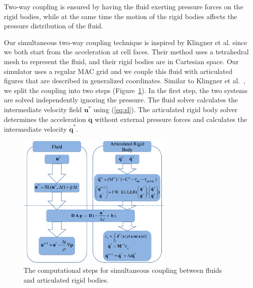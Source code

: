 Two-way coupling is ensured by having the fluid exerting pressure forces
on the rigid bodies, while at the same time the motion of the rigid bodies
affects the pressure distribution of the fluid.

Our simultaneous two-way coupling technique is inspired by Klingner et al.
\cite{klingner2006mesh} since we both start from the acceleration at
cell faces.  Their method uses a tetrahedral mesh to represent the fluid,
and their rigid bodies are in Cartesian space.  Our simulator uses a
regular MAC grid and we couple this fluid with articulated figures that
are described in generalized coordinates.  Similar to Klingner et
al.~\cite{klingner2006mesh}, we split the coupling into two steps
(Figure~\ref{fig:graph}). In the first step, the two systems are solved
independently ignoring the pressure. The fluid solver calculates the
intermediate velocity field $\mathbf{u}^*$ using (\ref{eq:sl}). The articulated
rigid body solver determines the acceleration $\mathbf{\ddot{q}}$ without
external pressure forces and calculates the intermediate velocity
$\mathbf{\dot{q}}^*$.

\begin{figure}[t]
\centering
\includegraphics[width=3in]{figures/CouplingProcess.eps}
\caption{The computational steps for simultaneous coupling between fluids and articulated rigid bodies.}
\label{fig:graph}
\end{figure}

